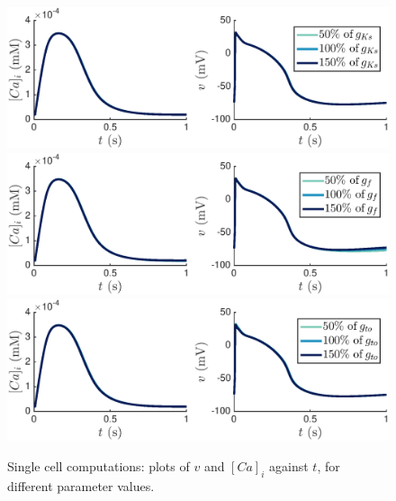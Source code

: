 \documentclass{article}
\begin{document}
%
\begin{figure}
   \includegraphics[trim=0cm 0cm 0cm 0cm, clip=true, width=1\linewidth]{sc_gks} 
   \includegraphics[trim=0cm 0cm 0cm 0cm, clip=true, width=1\linewidth]{sc_gf} 
      \includegraphics[trim=0cm 0cm 0cm 0cm, clip=true, width=1\linewidth]{sc_gto} 
    \caption{Single cell computations: plots of $v$ and $[Ca]_i$ against $t$, for different parameter values.}
    \label{fig:5a}
\end{figure}
%
\end{document}
